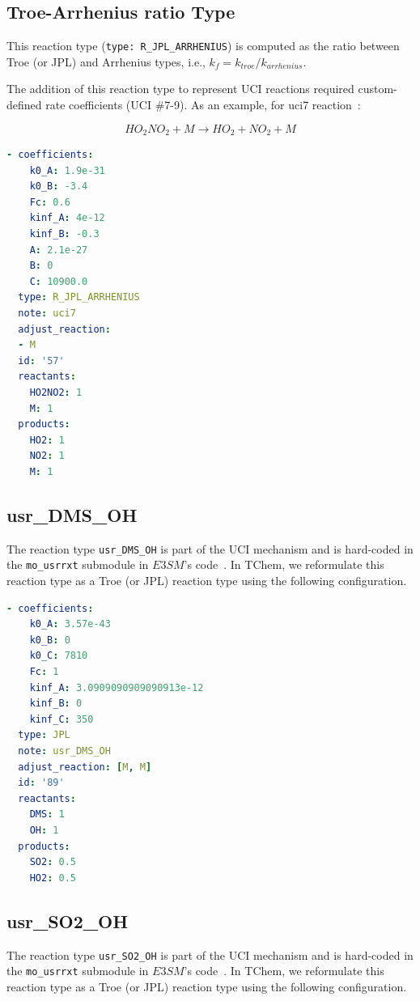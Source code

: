 \documentclass[report, 12pt]{SANDreport}
\newcommand{\eee}{E3SM}
\begin{document}
\subsection{Troe-Arrhenius ratio Type}

This reaction type (\verb|type: R_JPL_ARRHENIUS|) is computed as the ratio between Troe (or JPL) and Arrhenius types, i.e., $k_f=k_{troe}/k_{arrhenius}$.

The addition of this reaction type to represent UCI reactions required custom-defined rate coefficients (UCI \#7-9). As an example, for uci7 reaction~\cite{e3smweb}:

\begin{equation}
HO_2NO_2 + M \rightarrow HO_2 + NO_2 + M
\end{equation}

\begin{lstlisting}[language=yaml]
- coefficients:
    k0_A: 1.9e-31
    k0_B: -3.4
    Fc: 0.6
    kinf_A: 4e-12
    kinf_B: -0.3
    A: 2.1e-27
    B: 0
    C: 10900.0
  type: R_JPL_ARRHENIUS
  note: uci7
  adjust_reaction:
  - M
  id: '57'
  reactants:
    HO2NO2: 1
    M: 1
  products:
    HO2: 1
    NO2: 1
    M: 1
\end{lstlisting}
\subsection{usr\_DMS\_OH}

The reaction type \verb|usr_DMS_OH| is part of the UCI mechanism and is hard-coded in the \verb|mo_usrrxt| submodule in $\eee$'s code~\cite{e3smweb}. In TChem, we reformulate this reaction type as a Troe (or JPL) reaction type using the following configuration.

\begin{lstlisting}[language=yaml]
- coefficients:
    k0_A: 3.57e-43
    k0_B: 0
    k0_C: 7810
    Fc: 1
    kinf_A: 3.0909090909090913e-12
    kinf_B: 0
    kinf_C: 350
  type: JPL
  note: usr_DMS_OH
  adjust_reaction: [M, M]
  id: '89'
  reactants:
    DMS: 1
    OH: 1
  products:
    SO2: 0.5
    HO2: 0.5
\end{lstlisting}

\subsection{usr\_SO2\_OH}

The reaction type \verb|usr_SO2_OH| is part of the UCI mechanism and is hard-coded in the \verb|mo_usrrxt| submodule in $\eee$'s code~\cite{e3smweb}. In TChem, we reformulate this reaction type as a Troe (or JPL) reaction type using the following configuration.
\end{document}
